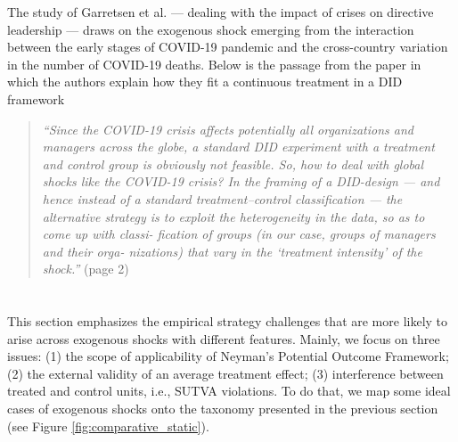 \documentclass[11pt]{article}
\begin{document}
\begin{refsection}
The study of Garretsen et al. \autocite*{garretsen2022} --- dealing with the impact of crises on directive leadership --- draws on the exogenous shock emerging from the interaction between the early stages of COVID-19 pandemic and the cross-country variation in the number of COVID-19 deaths. Below is the passage from the paper in which the authors explain how they fit a continuous  treatment in a DID framework

\begin{quote}
  \textit{
    ``Since the COVID-19 crisis affects potentially all organizations and
    managers across the globe, a standard DID
    experiment with a treatment and control group is obviously not feasible. So,
    how to deal with global shocks like the COVID-19 crisis?  In the framing of
    a DID-design --- and hence instead of a standard treatment–control
    classification --- the alternative strategy is to exploit the heterogeneity in
    the data, so as to come up with classi- fication of groups (in our case,
    groups of managers and their orga- nizations) that vary in the ‘treatment
    intensity’ of the shock.''
  }
  (page 2)
\end{quote}


\section{}
\label{sec:harnessing_exogenous_shocks}

\noindent This section emphasizes the empirical strategy challenges that are more likely to arise across exogenous shocks with different features. Mainly, we focus on three issues: (1) the scope of applicability of Neyman's Potential Outcome Framework; (2) the external validity of an average treatment effect; (3) interference between treated and control units, i.e., SUTVA violations. To do that, we map some ideal cases of exogenous shocks onto the taxonomy presented in the previous section (see Figure \ref{fig:comparative_static}).


\end{refsection}
\end{document}
